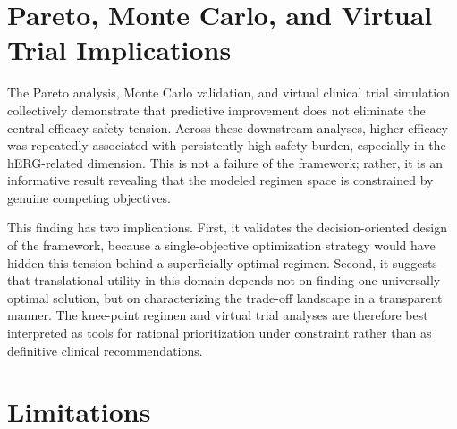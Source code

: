 \documentclass[a4paper,11pt,twoside]{report}
\begin{document}
\section{Pareto, Monte Carlo, and Virtual Trial Implications}

The Pareto analysis, Monte Carlo validation, and virtual clinical trial simulation collectively demonstrate that predictive improvement does not eliminate the central efficacy-safety tension. Across these downstream analyses, higher efficacy was repeatedly associated with persistently high safety burden, especially in the hERG-related dimension. This is not a failure of the framework; rather, it is an informative result revealing that the modeled regimen space is constrained by genuine competing objectives.

This finding has two implications. First, it validates the decision-oriented design of the framework, because a single-objective optimization strategy would have hidden this tension behind a superficially optimal regimen. Second, it suggests that translational utility in this domain depends not on finding one universally optimal solution, but on characterizing the trade-off landscape in a transparent manner. The knee-point regimen and virtual trial analyses are therefore best interpreted as tools for rational prioritization under constraint rather than as definitive clinical recommendations.

\section{Limitations}
\end{document}
